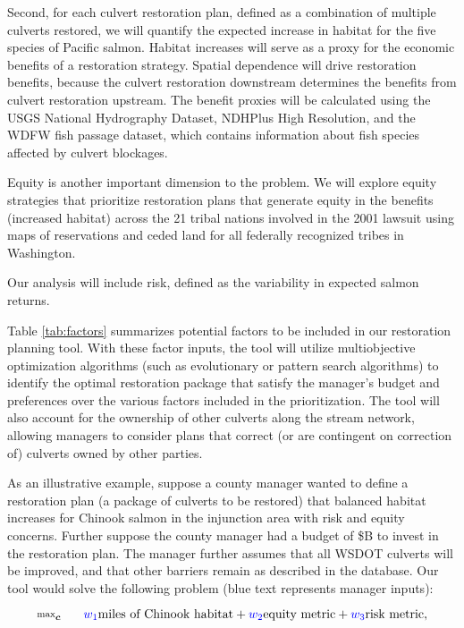 \documentclass[12pt]{elsarticle}
\begin{document}
Second, for each culvert restoration plan, defined as a combination of multiple culverts restored, we will quantify the expected increase in habitat for the five species of Pacific salmon. Habitat increases will serve as a proxy for the economic benefits of a restoration strategy. Spatial dependence will drive restoration benefits, because the culvert restoration downstream determines the benefits from culvert restoration upstream. The benefit proxies will be calculated using the USGS National Hydrography Dataset, NDHPlus High Resolution, and the WDFW fish passage dataset, which contains information about fish species affected by culvert blockages.

Equity is another important dimension to the problem. We will explore equity strategies that prioritize restoration plans that generate equity in the benefits (increased habitat) across the 21 tribal nations involved in the 2001 lawsuit using maps of reservations and ceded land for all federally recognized tribes in Washington. 

Our analysis will include risk, defined as the variability in expected salmon returns. %

Table \ref{tab:factors} summarizes potential factors to be included in our restoration planning tool. With these factor inputs, the tool will utilize multiobjective optimization algorithms (such as evolutionary or pattern search algorithms) to identify the optimal restoration package that satisfy the manager's budget and preferences over the various factors included in the prioritization. The tool will also account for the ownership of other culverts along the stream network, allowing managers to consider plans that correct (or are contingent on correction of) culverts owned by other parties.

As an illustrative example, suppose a county manager wanted to define a restoration plan (a package of culverts to be restored) that balanced habitat increases for Chinook salmon in the injunction area with risk and equity concerns. Further suppose the county manager had a budget of \$B to invest in the restoration plan. The manager further assumes that all WSDOT culverts will be improved, and that other barriers remain as described in the database. Our tool would solve the following problem (blue text represents manager inputs):

\begin{equation*}
\substack{\text{max}}_{\boldsymbol{c}}\hspace{0.25in} \textcolor{blue}{w_1} \text{miles of Chinook habitat} + \textcolor{blue}{w_2} \text{equity metric} + \textcolor{blue}{w_3} \text{risk metric},
\end{equation*}
\end{document}
